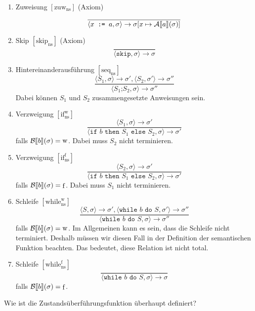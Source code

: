\documentclass[a4paper,12pt]{article}
\theoremstyle{definition}
\theoremstyle{plain}
\theoremstyle{remark}
\newcommand{\lsem}{\mathrm{[}\kern-.14em\mathrm{[}}
\newcommand{\rsem}{\mathrm{]}\kern-.14em\mathrm{]}}
\newcommand{\Bsem}[1]{\mathcal{B}\lsem#1\rsem}
\newcommand{\Asem}[1]{\mathcal{A}\lsem#1\rsem}
\newcommand{\strans}[3]{\langle #1, #2 \rangle \to #3}
\DeclareMathOperator{\true}{w}
\DeclareMathOperator{\false}{f}
\begin{document}
\begin{enumerate}
    \item Zuweisung $[\text{zuw}_{\text{ns}}]$ (Axiom)
    $$\frac{}{\strans{x \texttt{ := } a}{\sigma}{\sigma[x \mapsto \Asem{a}(\sigma)]}}$$

    \item Skip $[\text{skip}_{\text{ns}}]$ (Axiom)
    $$\frac{}{\strans{\texttt{skip}}{\sigma}{\sigma}}$$

    \item Hintereinanderausführung $[\text{seq}_{\text{ns}}]$
    $$\frac{\strans{S_1}{\sigma}{\sigma'}, \strans{S_2}{\sigma'}{\sigma''}}{\strans{S_1 \texttt{;} S_2}{\sigma}{\sigma''}}$$
    Dabei können $S_1$ und $S_2$ zusammengesetzte Anweisungen sein.

    \item Verzweigung $[\text{if}_{\text{ns}}^{\true}]$
    $$\frac{\strans{S_1}{\sigma}{\sigma'}}{\strans{\texttt{if } b \texttt{ then } S_1 \texttt{ else } S_2}{\sigma}{\sigma'}}$$
    falls $\Bsem{b}(\sigma) = \true$. Dabei muss $S_2$ nicht terminieren.

    \item Verzweigung $[\text{if}_{\text{ns}}^{\false}]$
    $$\frac{\langle S_2, \sigma \rangle \to \sigma'}{\langle \texttt{if } b \texttt{ then } S_1 \texttt{ else } S_2, \sigma \rangle \to \sigma'}$$
    falls $\Bsem{b}(\sigma) = \false$. Dabei muss $S_1$ nicht terminieren.

    \item Schleife $[\text{while}_{\text{ns}}^{\true}]$
    $$\frac{\langle S, \sigma \rangle \to \sigma', \langle \texttt{while } b \texttt{ do } S, \sigma' \rangle \to \sigma''}{\langle \texttt{while } b \texttt{ do } S, \sigma \rangle \to \sigma''}$$
    falls $\Bsem{b}(\sigma) = \true$. Im Allgemeinen kann es sein, dass die Schleife nicht terminiert. Deshalb müssen wir diesen Fall in der Definition der semantischen Funktion beachten. Das bedeutet, diese Relation ist nicht total.

    \item Schleife $[\text{while}_{\text{ns}}^{\false}]$
    $$\frac{\text{ }}{\langle \texttt{while } b \texttt{ do } S, \sigma \rangle \to \sigma}$$
    falls $\Bsem{b}(\sigma) = \false$.
\end{enumerate}

\par\bigskip
\par\bigskip
Wie ist die Zustandsüberführungsfunktion überhaupt definiert?
\end{document}
